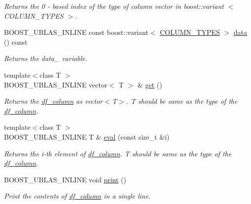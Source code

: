 \begin{DoxyCompactItemize}
\begin{DoxyCompactList}\small\item\em Returns the 0 -\/ based index of the type of column vector in boost\+::variant $<$ C\+O\+L\+U\+M\+N\+\_\+\+T\+Y\+P\+ES $>$. \end{DoxyCompactList}\item 
B\+O\+O\+S\+T\+\_\+\+U\+B\+L\+A\+S\+\_\+\+I\+N\+L\+I\+NE const boost\+::variant$<$ \hyperlink{df_8hpp_a9c2402c5ed22207ed96c90756cc34057}{C\+O\+L\+U\+M\+N\+\_\+\+T\+Y\+P\+ES} $>$ \hyperlink{classboost_1_1numeric_1_1ublas_1_1df__column_ae8691246ec130db7ac17d784de562044}{data} () const 
\begin{DoxyCompactList}\small\item\em Returns the data\+\_\+ variable. \end{DoxyCompactList}\item 
{\footnotesize template$<$class T $>$ }\\B\+O\+O\+S\+T\+\_\+\+U\+B\+L\+A\+S\+\_\+\+I\+N\+L\+I\+NE vector$<$ T $>$ \& \hyperlink{classboost_1_1numeric_1_1ublas_1_1df__column_a166ffc39d030e2773661bd24f79f66c3}{get} ()
\begin{DoxyCompactList}\small\item\em Returns the \hyperlink{classboost_1_1numeric_1_1ublas_1_1df__column}{df\+\_\+column} as vector$<$\+T$>$. T should be same as the type of the \hyperlink{classboost_1_1numeric_1_1ublas_1_1df__column}{df\+\_\+column}. \end{DoxyCompactList}\item 
{\footnotesize template$<$class T $>$ }\\B\+O\+O\+S\+T\+\_\+\+U\+B\+L\+A\+S\+\_\+\+I\+N\+L\+I\+NE T \& \hyperlink{classboost_1_1numeric_1_1ublas_1_1df__column_a86634b6c76d89f457fe6edc79abc9218}{eval} (const size\+\_\+t \&i)
\begin{DoxyCompactList}\small\item\em Returns the i-\/th element of \hyperlink{classboost_1_1numeric_1_1ublas_1_1df__column}{df\+\_\+column}. T should be same as the type of the \hyperlink{classboost_1_1numeric_1_1ublas_1_1df__column}{df\+\_\+column}. \end{DoxyCompactList}\item 
B\+O\+O\+S\+T\+\_\+\+U\+B\+L\+A\+S\+\_\+\+I\+N\+L\+I\+NE void \hyperlink{classboost_1_1numeric_1_1ublas_1_1df__column_a86f765aef7580f3f3e72108d02f7e861}{print} ()
\begin{DoxyCompactList}\small\item\em Print the contents of \hyperlink{classboost_1_1numeric_1_1ublas_1_1df__column}{df\+\_\+column} in a single line. \end{DoxyCompactList}\item 

\end{DoxyCompactItemize}
